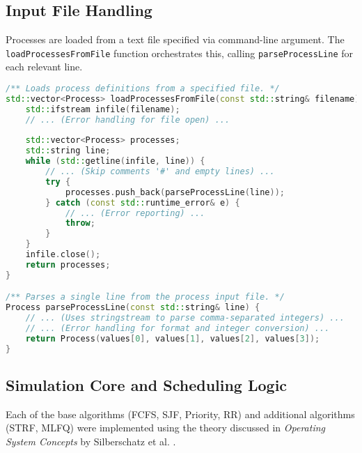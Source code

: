 \documentclass[12pt]{article}
\begin{document}
\subsection{Input File Handling}
Processes are loaded from a text file specified via command-line argument. The \texttt{loadProcessesFromFile} function orchestrates this, calling \texttt{parseProcessLine} for each relevant line.
\begin{lstlisting}[language=C++, caption={Input File Parsing Logic (main.cpp)}, style=cppstyle]
/** Loads process definitions from a specified file. */
std::vector<Process> loadProcessesFromFile(const std::string& filename) {
    std::ifstream infile(filename);
    // ... (Error handling for file open) ...
    
    std::vector<Process> processes;
    std::string line;
    while (std::getline(infile, line)) {
        // ... (Skip comments '#' and empty lines) ...
        try {
            processes.push_back(parseProcessLine(line));
        } catch (const std::runtime_error& e) {
            // ... (Error reporting) ...
            throw; 
        }
    }
    infile.close();
    return processes;
}

/** Parses a single line from the process input file. */
Process parseProcessLine(const std::string& line) {
    // ... (Uses stringstream to parse comma-separated integers) ...
    // ... (Error handling for format and integer conversion) ...
    return Process(values[0], values[1], values[2], values[3]);
}
\end{lstlisting}

\subsection{Simulation Core and Scheduling Logic}
Each of the base algorithms (FCFS, SJF, Priority, RR) and additional algorithms (STRF, MLFQ) were implemented using the theory discussed in \textit{Operating System Concepts} by Silberschatz et al. \cite{silberschatz2018operating}.
\end{document}
